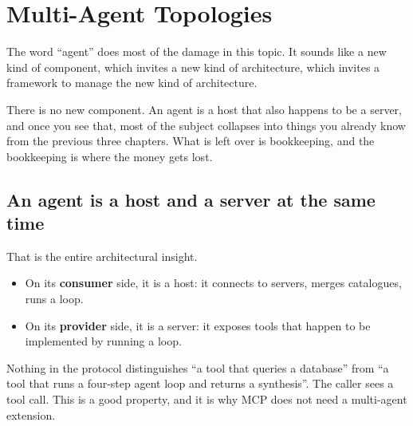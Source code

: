 \chapter{Multi-Agent Topologies}
\label{ch:multi-agent}

The word ``agent'' does most of the damage in this topic. It sounds like a new
kind of component, which invites a new kind of architecture, which invites a
framework to manage the new kind of architecture.

There is no new component. An agent is a host that also happens to be a server,
and once you see that, most of the subject collapses into things you already
know from the previous three chapters. What is left over is bookkeeping, and the
bookkeeping is where the money gets lost.

\section{An agent is a host and a server at the same time}

That is the entire architectural insight.

\begin{itemize}[leftmargin=1.6em, itemsep=2pt]
\item On its \textbf{consumer} side, it is a host: it connects to servers,
merges catalogues, runs a loop.
\item On its \textbf{provider} side, it is a server: it exposes tools that
happen to be implemented by running a loop.
\end{itemize}

Nothing in the protocol distinguishes ``a tool that queries a database'' from ``a
tool that runs a four-step agent loop and returns a synthesis''. The caller sees
a tool call. This is a good property, and it is why MCP does not need a
multi-agent extension.

